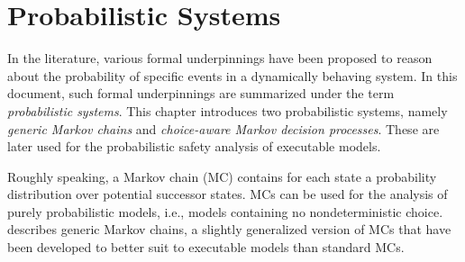 \newcommand*{\cmdpLeadstoAdheringScheduler}[1]{\tsleadsto_{#1}} %
\newcommand*{\CmdpFinPathsAdheringScheduler}[1]{\FinPaths^{\Cmdp,#1}}
\newcommand*{\CmdpChoicePathsAdheringScheduler}[1]{\ChoicePathsOf{\Cmdp,#1}}
\newcommand*{\CmdpCylinder}[2]{\CylinderOf{\Cmdp,#1}{#2}}
\newcommand*{\CmdpProb}[1]{\ProbOf{\Cmdp,#1}}
\newcommand*{\CmdpProbInState}[2]{\ProbOfInState{\Cmdp,#1}{#2}}
\newcommand*{\CmdpSamples}[1]{\ProbSampleSpace^{\Cmdp,#1}}
\newcommand*{\CmdpSamplesInState}[2]{\ProbSampleSpace_{#2}^{\Cmdp,#1}}
\newcommand*{\CmdpEvents}[1]{\ProbSetOfEvents^{\Cmdp,#1}}
\newcommand*{\CmdpEventsInState}[2]{\ProbSetOfEvents_{#2}^{\Cmdp,#1}}
\newcommand*{\correspondingOfCmdp}{{}}
\newcommand*{\correspondingOfMc}{{\stixleftarrowaccent{c}}}



\newcommand*{\expr}{e}
\newcommand*{\dsformula}[1]{\expr{}#1}
\newcommand*{\dsvariablevaluation}[2]{$\textrm{\code{#1}}=#2$}



\let\depth\relax
\newcommand{\CSharp}{{\protect\settoheight{\dimen0}{C}C\kern-.05em \protect\resizebox{!}{\dimen0}{\protect\raisebox{\depth}{\#}}}\xspace}
\newcommand{\SSharp}{{\protect\settoheight{\dimen0}{S}S\kern-.05em \protect\resizebox{!}{\dimen0}{\protect\raisebox{\depth}{\#}}}\xspace}







\chapter{Probabilistic Systems}\label{ch:FormalFoundations}

In the literature, various formal underpinnings have been proposed to reason about the probability of specific events in a dynamically behaving system.
In this document, such formal underpinnings are summarized under the term \emph{probabilistic systems}.
This chapter introduces two probabilistic systems, namely \emph{generic Markov chains} and \emph{choice-aware Markov decision processes}.
These are later used for the probabilistic safety analysis of executable models.

Roughly speaking, a Markov chain (MC) contains for each state a probability distribution over potential successor states.
MCs can be used for the analysis of purely probabilistic models, i.e., models containing no nondeterministic choice.
 describes generic Markov chains, a slightly generalized version of MCs that have been developed to better suit to executable models than standard MCs.

